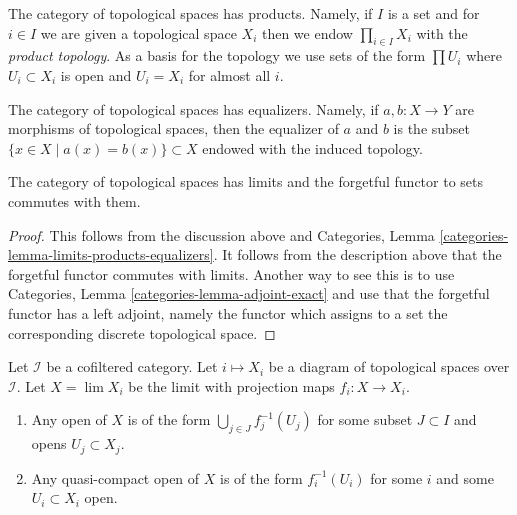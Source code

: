 \noindent
The category of topological spaces has products. Namely, if $I$ is a set
and for $i \in I$ we are given a topological space $X_i$ then we endow
$\prod_{i \in I} X_i$ with the {\it product topology}. As a basis for
the topology we use sets of the form $\prod U_i$ where $U_i \subset X_i$
is open and $U_i = X_i$ for almost all $i$.

\medskip\noindent
The category of topological spaces has equalizers. Namely, if
$a, b : X \to Y$ are morphisms of topological spaces, then the
equalizer of $a$ and $b$ is the subset $\{x \in X \mid a(x) = b(x)\} \subset X$
endowed with the induced topology.

\begin{lemma}
\label{lemma-limits}
The category of topological spaces has limits and the forgetful functor
to sets commutes with them.
\end{lemma}

\begin{proof}
This follows from the discussion above and
Categories, Lemma \ref{categories-lemma-limits-products-equalizers}.
It follows from the description above that the forgetful functor
commutes with limits. Another way to see this is to use
Categories, Lemma \ref{categories-lemma-adjoint-exact} and use that
the forgetful functor has a left adjoint, namely the functor which
assigns to a set the corresponding discrete topological space.
\end{proof}

\begin{lemma}
\label{lemma-describe-limits}
Let $\mathcal{I}$ be a cofiltered category. Let $i \mapsto X_i$ be a diagram
of topological spaces over $\mathcal{I}$. Let $X = \lim X_i$ be the limit
with projection maps $f_i : X \to X_i$.
\begin{enumerate}
\item Any open of $X$ is of the form $\bigcup_{j \in J} f_j^{-1}(U_j)$
for some subset $J \subset I$ and opens $U_j \subset X_j$.
\item Any quasi-compact open of $X$ is of the form
$f_i^{-1}(U_i)$ for some $i$ and some $U_i \subset X_i$ open.
\end{enumerate}
\end{lemma}

